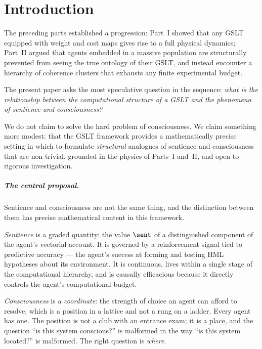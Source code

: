 \chapter{Introduction}

The preceding parts established a progression:
Part~I showed that any GSLT equipped with weight
and cost maps gives rise to a full physical dynamics;
Part~II argued that agents embedded in a massive
population are structurally prevented from seeing the true ontology
of their GSLT, and instead encounter a hierarchy of coherence
clusters that exhausts any finite experimental budget.

The present paper asks the most speculative question in the sequence:
\emph{what is the relationship between the computational structure of
a GSLT and the phenomena of sentience and consciousness?}

We do not claim to solve the hard problem of consciousness.
We claim something more modest: that the GSLT framework provides a
mathematically precise setting in which to formulate
\emph{structural} analogues of sentience and consciousness that are
non-trivial, grounded in the physics of Parts~I and~II, and
open to rigorous investigation.

\paragraph{The central proposal.}
Sentience and consciousness are not the same thing, and the
distinction between them has precise mathematical content in this
framework.

\emph{Sentience} is a graded quantity: the value $\sent$ of a
distinguished component of the agent's vectorial account.
It is governed by a reinforcement signal tied to predictive
accuracy --- the agent's success at forming and testing HML
hypotheses about its environment.
It is continuous, lives within a single stage of the computational
hierarchy, and is causally efficacious because it directly controls
the agent's computational budget.

\emph{Consciousness} is a \emph{coordinate}: the strength of choice
an agent can afford to resolve, which is a position in a lattice and
not a rung on a ladder.
Every agent has one.
The position is not a club with an entrance exam; it is a place, and
the question ``is this system conscious?'' is malformed in the way
``is this system located?'' is malformed.
The right question is \emph{where}.

